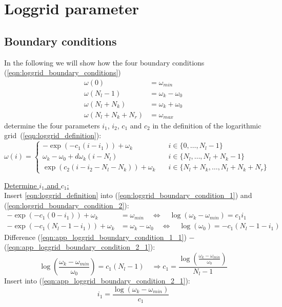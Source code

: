 \appendix
\chapter{Loggrid parameter}
\section{Boundary conditions}
\label{sec:app_loggrid_boundary}
In the following we will show how the four boundary conditions (\ref{eqn:loggrid_boundary_conditions})
\begin{align}
	\omega(0)&=\omega_{min}   \label{eqn:loggrid_boundary_condition_1}\\
	\omega(N_l-1)&=\omega_k-\omega_0  \label{eqn:loggrid_boundary_condition_2}\\
	\omega(N_l+N_k)&=\omega_k+\omega_0   \label{eqn:loggrid_boundary_condition_3}\\
	\omega(N_l+N_k+N_r)&=\omega_{max}   \label{eqn:loggrid_boundary_condition_4}
\end{align}
determine the four parameters $i_1$, $i_2$, $c_1$ and $c_2$ in the definition of the logarithmic grid~(\ref{eqn:loggrid_definition}):
\begin{equation*}
	\omega(i)=\begin{cases}
		-\exp(-c_1(i-i_1)) + \omega_k 		\quad & i\in\{0,\dots,N_l-1\} \\ 
		\omega_k-\omega_0+d\omega_k(i-N_l)	\quad & i\in\{N_l,\dots,N_l+N_k-1\} \\ 
		\exp(c_2(i-i_2-N_l-N_k)) + \omega_k 	\quad & i\in\{N_l+N_k,\dots,N_l+N_k+N_r\}
	\end{cases}
\end{equation*}

\vspace{1cm}
\noindent\underline{Determine $i_1$ and $c_1$:}\\

\noindent Insert \ref{eqn:loggrid_definition} into (\ref{eqn:loggrid_boundary_condition_1}) and (\ref{eqn:loggrid_boundary_condition_2}):
\begin{align}
	-\exp(-c_1(0-i_1))+\omega_k&=\omega_{min} \quad \Leftrightarrow \quad \log(\omega_k-\omega_{min})=c_1 i_1 \label{eqn:app_loggrid_boundary_condition_1_1}\\
	-\exp(-c_1(N_l-1-i_1))+\omega_k&=\omega_k-\omega_0 \quad \Leftrightarrow \quad \log(\omega_0)=-c_1(N_l-1-i_1) \label{eqn:app_loggrid_boundary_condition_2_1}
\end{align}
Difference (\ref{eqn:app_loggrid_boundary_condition_1_1}) $-$ (\ref{eqn:app_loggrid_boundary_condition_2_1}):
\[
	\log\left(\frac{\omega_k-\omega_{min}}{\omega_0}\right)=c_1 (N_l-1) \quad \boxed{\Rightarrow c_1=\frac{\log\left(\frac{\omega_k-\omega_{min}}{\omega_0}\right)}{N_l-1}}
\]
Insert into (\ref{eqn:app_loggrid_boundary_condition_2_1}):
\[
	\boxed{i_1=\frac{\log(\omega_k-\omega_{min})}{c_1}}
\]

